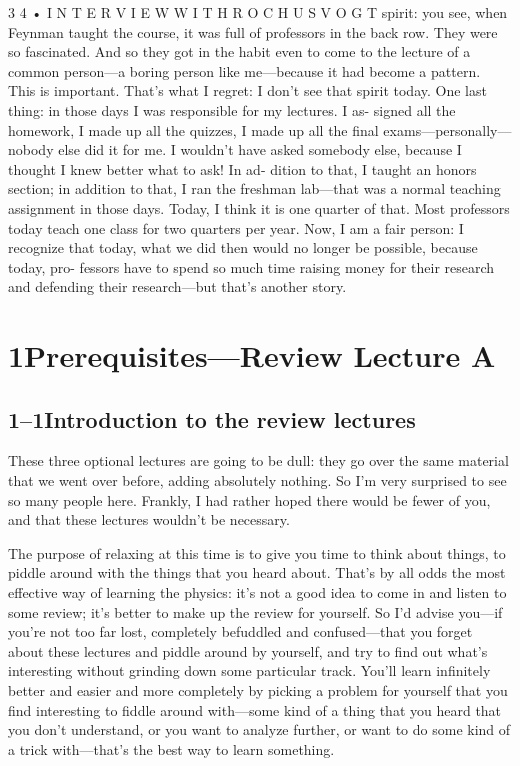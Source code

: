 \documentclass[11pt,oneside]{article}
\begin{document}
3 4 • I N T E R V I E W  W I T H  R O C H U S  V O G T spirit: you see, when Feynman taught the course, it was full of professors in the back row. They were so fascinated. And so they got in the habit even to come to the lecture of a common person---a boring person like me---because it had become a pattern. This is important. That’s what I regret: I don’t see that spirit today. One last thing: in those days I was responsible for my lectures. I as- signed all the homework, I made up all the quizzes, I made up all the final exams---personally---nobody else did it for me. I wouldn’t have asked somebody else, because I thought I knew better what to ask! In ad- dition to that, I taught an honors section; in addition to that, I ran the freshman lab---that was a normal teaching assignment in those days. Today, I think it is one quarter of that. Most professors today teach one class for two quarters per year. Now, I am a fair person: I recognize that today, what we did then would no longer be possible, because today, pro- fessors have to spend so much time raising money for their research and defending their research---but that’s another story.\par



\clearpage

\section*{1Prerequisites---Review Lecture A}


\subsection*{1--1Introduction to the review lectures}

These three optional lectures are going to be dull: they go over the same material that we went over before, adding absolutely nothing. So I'm very surprised to see so many people here. Frankly, I had rather hoped there would be fewer of you, and that these lectures wouldn't be necessary.\par

The purpose of relaxing at this time is to give you time to think about things, to piddle around with the things that you heard about. That's by all odds the most effective way of learning the physics: it's not a good idea to come in and listen to some review; it's better to make up the review for yourself. So I'd advise you---if you're not too far lost, completely befuddled and confused---that you forget about these lectures and piddle around by yourself, and try to find out what's interesting without grinding down some particular track. You'll learn infinitely better and easier and more completely by picking a problem for yourself that you find interesting to fiddle around with---some kind of a thing that you heard that you don't understand, or you want to analyze further, or want to do some kind of a trick with---that's the best way to learn something.\par
\end{document}
